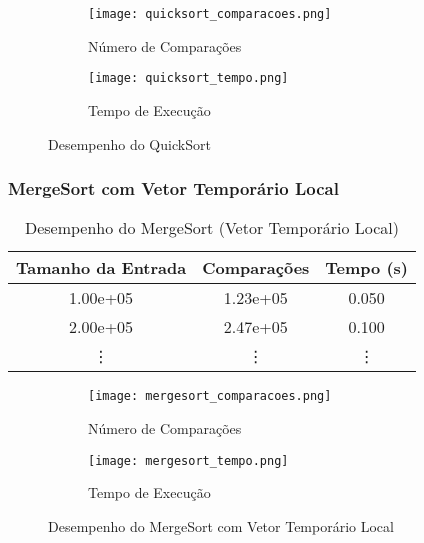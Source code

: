 \documentclass[a4paper,12pt]{article}
\begin{document}
\begin{figure}[H]
    \centering
    \begin{subfigure}[b]{0.6\textwidth} %
        \texttt{[image: quicksort\_comparacoes.png]}
        \caption{Número de Comparações}
        \label{fig:quicksort_comparacoes}
    \end{subfigure}
    \hfill
    \begin{subfigure}[b]{0.6\textwidth} %
        \texttt{[image: quicksort\_tempo.png]}
        \caption{Tempo de Execução}
        \label{fig:quicksort_tempo}
    \end{subfigure}
    \caption{Desempenho do QuickSort}
    \label{fig:quicksort}
\end{figure}

\subsubsection{MergeSort com Vetor Temporário Local}

\begin{table}[H]
    \centering
    \caption{Desempenho do MergeSort (Vetor Temporário Local)}
    \begin{tabular}{@{}ccc@{}}
        \toprule
        \textbf{Tamanho da Entrada} & \textbf{Comparações} & \textbf{Tempo (s)} \\ \midrule
        1.00e+05                      & 1.23e+05        & 0.050            \\
        2.00e+05                      & 2.47e+05        & 0.100            \\
        \vdots                       & \vdots               & \vdots             \\
        \bottomrule
    \end{tabular}
    \label{tab:mergesort_local}
\end{table}

\begin{figure}[H]
    \centering
    \begin{subfigure}[b]{0.6\textwidth} %
        \texttt{[image: mergesort\_comparacoes.png]}
        \caption{Número de Comparações}
        \label{fig:mergesort_comparacoes}
    \end{subfigure}
    \hfill
    \begin{subfigure}[b]{0.6\textwidth} %
        \texttt{[image: mergesort\_tempo.png]}
        \caption{Tempo de Execução}
        \label{fig:mergesort_local_tempo}
    \end{subfigure}
    \caption{Desempenho do MergeSort com Vetor Temporário Local}
    \label{fig:mergesort_local}
\end{figure}
\end{document}
